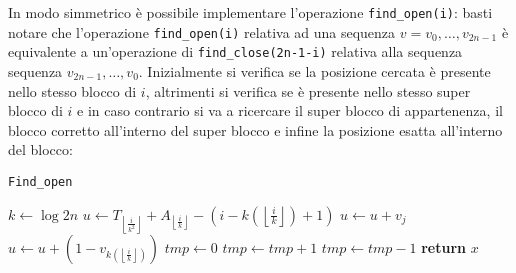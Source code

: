 \documentclass{article}
\begin{document}
In modo simmetrico è possibile implementare l'operazione \texttt{find\_open(i)}: basti notare che l'operazione \texttt{find\_open(i)} relativa ad una sequenza $v=v_0,\dots,v_{2n-1}$ è equivalente a un'operazione di \texttt{find\_close(2n-1-i)} relativa alla sequenza sequenza $v_{2n-1},\dots,v_0$. Inizialmente si verifica se la posizione cercata è presente nello stesso blocco di $i$, altrimenti si verifica se è presente nello stesso super blocco di $i$ e in caso contrario si va a ricercare il super blocco di appartenenza, il blocco corretto all'interno del super blocco e infine la posizione esatta all'interno del blocco:
    \begin{algorithm}[H]
    \caption{\texttt{Find\_open}}\label{findopen}
    \begin{algorithmic}[1]
        \State $k\gets\log{2n}$
        \State $u\gets T_{\left\lfloor{\frac{i}{k^2}}\right\rfloor}+A_{\left\lfloor{\frac{i}{k}}\right\rfloor}-(i-k(\left\lfloor{\frac{i}{k}}\right\rfloor)+1)$
            \State $u\gets u+v_j$
        \EndFor
        \State $u\gets u+(1-v_{k(\left\lfloor{\frac{i}{k}}\right\rfloor)})$
        \State
        \State $tmp\gets 0$
                \State $tmp\gets tmp+1$
            \Else  
                \State $tmp\gets tmp-1$
            \EndIf
                \State \textbf{return} $x$
            \EndIf
        \EndFor
    \end{algorithmic}
    \end{algorithm}
\end{document}
